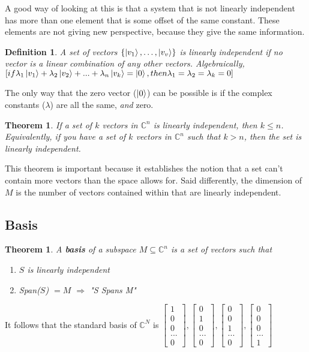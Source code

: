 \documentclass[12pt]{article}
\theoremstyle{plain}
\newtheorem{theorem}[lemma]{Theorem}
\theoremstyle{nonumberplain}
\theoremstyle{plain}
\newtheorem{definition}[lemma]{Definition}
\theoremstyle{nonumberplain}
\newcommand\1{{\bf 1}}
\newcommand{\bmat}[1]{\begin{bmatrix*} #1 \end{bmatrix*}} %
\newcommand{\setovecs}[1]{\lb \ket{v_1}, \ldots, \ket{v_{#1}}\rb} %
\newcommand{\C}{\mathbb{C}} %
\newcommand{\<}{\left\langle}
\renewcommand{\>}{\right\rangle}
\newcommand{\lb}{\left\{}
\newcommand{\rb}{\right\}}
\begin{document}
A good way of looking at this is that a system that is not linearly independent has more than one element that is some offset of the same constant. These elements are not giving new perspective, because they give the same information.

\begin{definition}
A set of vectors $\setovecs{v}$ is linearly independent if no vector is a linear combination of any other vectors. Algebraically, $[if \lambda_1\ket{v_1} + \lambda_2\ket{v_2} + ... + \lambda_n\ket{v_k}=\ket{0}, then \lambda_1=\lambda_2=\lambda_k=0]$
\end{definition}

The only way that the zero vector ($\ket{0}$) can be possible is if the complex constants ($\lambda$) are all the same, \textit{and} zero.

\begin{theorem}
If a set of $k$ vectors in $\C^n$ is linearly independent, then $k \leq n$. Equivalently, if you have a set of $k$ vectors in $\C^n$ such that $k>n$, then the set is linearly independent.
\end{theorem}

This theorem is important because it establishes the notion that a set can't contain more vectors than the space allows for. Said differently, the dimension of $M$ is the number of vectors contained within that are linearly independent.


\subsection{Basis}
\begin{theorem}
A \textbf{basis} of a subspace $M\subseteq\C^n$ is a set of vectors such that
\begin{enumerate}
	\item $S$ is linearly independent
	\item Span($S$) $=M$ $\Longrightarrow$ "S Spans M"
\end{enumerate}
\end{theorem}
It follows that the standard basis of $\C^N$ is $\bmat{1 \\ 0 \\ 0 \\ ... \\ 0},\bmat{0 \\ 1 \\ 0 \\ ... \\ 0},\bmat{0 \\ 0 \\ 1 \\ ... \\ 0},\bmat{0 \\ 0 \\ 0 \\ ... \\ 1}$
\end{document}
